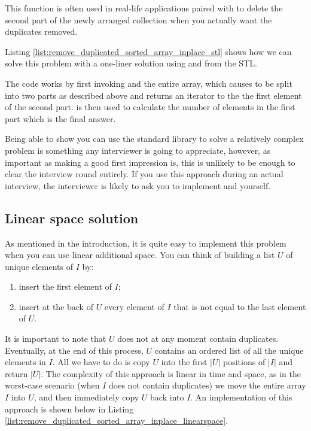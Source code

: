 This function is often used in real-life applications paired with \href{https://en.cppreference.com/w/cpp/container/vector/erase2}{} to delete the second part of the newly
arranged collection when you actually want the duplicates removed.

Listing \ref{list:remove_duplicated_sorted_array_inplace_stl} shows how we can
solve this problem with a one-liner solution using  and  from the STL. 




The code works by first invoking  and the entire array, which causes  to be split into two parts as described above and returns an iterator to the the first element of the second part. 
 is then used to calculate the number of elements in the first part which is the final answer.

Being able to show you can use the standard library to solve a relatively complex problem is something any interviewer is going to appreciate, however, as important as making a good first impression is, this is unlikely to be enough to clear the interview round entirely. If you use this approach
during an actual interview, the interviewer is likely to ask you to implement  and  yourself.



\subsection{Linear space solution}

As mentioned in the introduction, it is quite easy to implement this problem when you can use
linear additional space. You can think of building a list $U$ of unique elements of $I$ by:

\begin{enumerate}
	\item insert the first element of $I$;
	\item insert at the back of $U$ every element of $I$ that is not equal to the last element of $U$.
\end{enumerate}



It is important to note that $U$ does not at any moment contain duplicates. Eventually, at the end of this process, $U$ contains an ordered list of all the unique elements in $I$. All we
have to do is copy $U$ into the first $|U|$ positions of $|I|$ and return $|U|$. The complexity
of this approach is linear in time and space, as in the worst-case scenario (when $I$ does not contain duplicates) we move the entire array $I$ into $U$, and then immediately copy $U$ back into $I$. An implementation of this approach is shown below in Listing
\ref{list:remove_duplicated_sorted_array_inplace_linearspace}.

